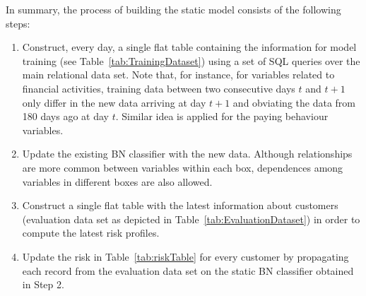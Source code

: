 In summary, the process of building the static model consists of the following steps:
\begin{enumerate}
\item Construct, every day, a single flat table containing the information for model training (see Table~\ref{tab:TrainingDataset}) using a set of SQL queries over the main relational data set. Note that, for instance, for variables related to financial activities, training data between two consecutive days $t$ and $t+1$ only differ in the new data arriving at day $t+1$ and obviating the data from 180 days ago at day $t$. Similar idea is applied for the paying behaviour variables.
\item Update the existing BN classifier with the new data. Although relationships are more common between variables within each box, dependences among variables in different boxes are also allowed. 
\item Construct a single flat table with the latest information about customers (evaluation data set as depicted in Table~\ref{tab:EvaluationDataset}) in order to compute the latest risk profiles. 
\item Update the risk in Table~\ref{tab:riskTable} for every customer by propagating each record from the evaluation data set on the static BN classifier obtained in Step 2. 
\end{enumerate}





